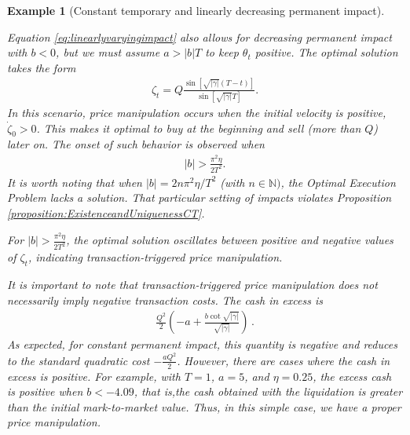 \documentclass[final,3p,authoryear,12pt]{elsarticle}
\newtheorem{example}{Example}
\begin{document}
\begin{example}[Constant temporary and linearly decreasing permanent impact]
\label{example:linearlydecreasingpermanentCT}

Equation \eqref{eq:linearlyvaryingimpact} also allows for decreasing permanent impact with $b<0$, but we must assume $a>|b|T$ to keep $\theta_t$ positive. The optimal solution takes the form
\begin{eqnarray}
    \zeta_t=Q \frac{\sin [\sqrt{|\gamma|} (T-t)]}{\sin[\sqrt{|\gamma|} T]}.
\end{eqnarray}
In this scenario, price manipulation occurs when the initial velocity is positive, $\dot \zeta_0>0$. This makes it optimal to buy at the beginning and sell (more than $Q$) later on. The onset of such behavior is observed when
\begin{eqnarray}
    |b|>\frac{\pi^2\eta}{2T^2}.
\end{eqnarray}
It is worth noting that when $|b|=2n\pi^2\eta/T^2$ (with $n\in\mathbb{N})$, the Optimal Execution Problem lacks a solution. That particular setting of impacts violates Proposition \ref{proposition:ExistenceandUniquenessCT}. %

For $|b| > \frac{\pi^2\eta}{2T^2}$, the optimal solution oscillates between positive and negative values of $\zeta_t$, indicating transaction-triggered price manipulation.

It is important to note that transaction-triggered price manipulation does not necessarily imply negative transaction costs. The cash in excess is
\begin{align}
     \frac{Q^2}{2} \left(-a + \frac{b \cot\sqrt{|\gamma|}}{\sqrt{|\gamma|}}\right)\,.
\end{align}
As expected, for constant permanent impact, this quantity is negative and reduces to the standard quadratic cost $-\frac{aQ^2}{2}$. However, there are cases where the cash in excess is positive. For example, with $T=1$, $a=5$, and $\eta=0.25$, the excess cash is positive when $b<-4.09$, that is,the cash obtained with the liquidation is greater than the initial mark-to-market value. Thus, in this simple case, we have a proper price manipulation.
\end{example}
\end{document}
